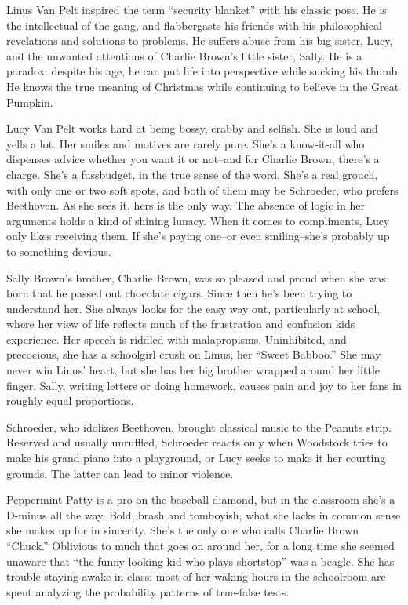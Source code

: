 Linus Van Pelt inspired the term ``security blanket'' with his classic pose. He is the intellectual of the gang, and flabbergasts his friends with his philosophical revelations and solutions to problems. He suffers abuse from his big sister, Lucy, and the unwanted attentions of Charlie Brown's little sister, Sally. He is a paradox: despite his age, he can put life into perspective while sucking his thumb. He knows the true meaning of Christmas while continuing to believe in the Great Pumpkin.


Lucy Van Pelt works hard at being bossy, crabby and selfish. She is loud and yells a lot. Her smiles and motives are rarely pure. She's a know-it-all who dispenses advice whether you want it or not--and for Charlie Brown, there's a charge. She's a fussbudget, in the true sense of the word. She's a real grouch, with only one or two soft spots, and both of them may be Schroeder, who prefers Beethoven. As she sees it, hers is the only way. The absence of logic in her arguments holds a kind of shining lunacy. When it comes to compliments, Lucy only likes receiving them. If she's paying one--or even smiling--she's probably up to something devious.


Sally Brown's brother, Charlie Brown, was so pleased and proud when she was born that he passed out chocolate cigars. Since then he's been trying to understand her. She always looks for the easy way out, particularly at school, where her view of life reflects much of the frustration and confusion kids experience. Her speech is riddled with malapropisms. Uninhibited, and precocious, she has a schoolgirl crush on Linus, her ``Sweet Babboo.'' She may never win Linus' heart, but she has her big brother wrapped around her little finger. Sally, writing letters or doing homework, causes pain and joy to her fans in roughly equal proportions.



Schroeder, who idolizes Beethoven, brought classical music to the Peanuts strip. Reserved and usually unruffled, Schroeder reacts only when Woodstock tries to make his grand piano into a playground, or Lucy seeks to make it her courting grounds. The latter can lead to minor violence.



Peppermint Patty is a pro on the baseball diamond, but in the classroom she's a D-minus all the way. Bold, brash and tomboyish, what she lacks in common sense she makes up for in sincerity. She's the only one who calls Charlie Brown ``Chuck.'' Oblivious to much that goes on around her, for a long time she seemed unaware that ``the funny-looking kid who plays shortstop'' was a beagle. She has trouble staying awake in class; most of her waking hours in the schoolroom are spent analyzing the probability patterns of true-false tests.


